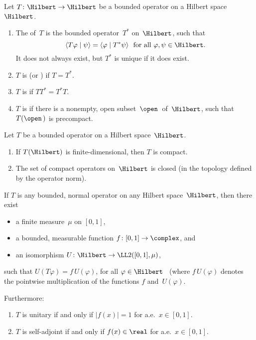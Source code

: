 \begin{defns}
Let $T \colon \Hilbert \to \Hilbert$ be a bounded operator on a Hilbert space~$\Hilbert$.%
\noprelistbreak
	\begin{enumerate}
	\item The  of~$T$ is the bounded operator~$T^*$ on~$\Hilbert$, such that 
		$$ \text{$\langle T \varphi \mid \psi \rangle = \langle \varphi \mid T^* \psi \rangle$ \ for all $\varphi,\psi \in \Hilbert$} .$$
It does not always exist, but $T^*$ is unique if it does exist.
	
	\item $T$ is  (or ) if $T = T^*$.
	
	\item $T$ is  if $T T^* = T^* T$.
	
	\item $T$ is  if there is a nonempty, open subset~$\open$\, of~$\Hilbert$, such that $T(\open\,)$ is precompact.
	
	\end{enumerate}
\end{defns}

\begin{prop} \label{CpctOpBasics}
Let $T$ be a bounded operator on a Hilbert space~$\Hilbert$.
	\begin{enumerate}
	\item If $T(\Hilbert)$ is finite-dimensional, then $T$ is compact.
	\item The set of compact operators on~$\Hilbert$ is closed\/ \textup(in the topology defined by the operator norm\/\textup).
	\end{enumerate}
\end{prop}

\begin{prop} \label{SpectralThm}
If $T$ is any bounded, normal operator on any Hilbert space~$\Hilbert$, then there exist
	\begin{itemize}
	\item a finite measure~$\mu$ on $[0,1]$, 
	\item a bounded, measurable function $f \colon [0,1] \to \complex$,
	and
	\item an isomorphism\/ $U \colon \Hilbert \to \LL2([0,1],\mu)$,
	\end{itemize}
such that $U( T \varphi ) = f \, U(\varphi)$, for all $\varphi \in \Hilbert$ \ \textup(where $f \, U(\varphi)$ denotes the pointwise multiplication of the functions $f$ and~$U(\varphi)$.

Furthermore:
	\begin{enumerate} 
	\item $T$ is unitary if and only if $|f(x)| = 1$ for a.e.\ $x \in [0,1]$.
	\item $T$ is self-adjoint if and only if $f(x) \in \real$ for a.e.\ $x \in [0,1]$.
	\end{enumerate}
\end{prop}

